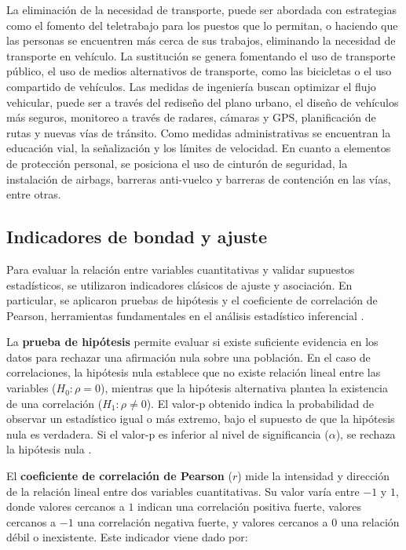 \documentclass[12pt]{article}
\begin{document}
La eliminación de la necesidad de transporte, puede ser abordada con estrategias como el fomento del teletrabajo para los puestos que lo permitan, o haciendo que las personas se encuentren más cerca de sus trabajos, eliminando la necesidad de transporte en vehículo. La sustitución se genera fomentando el uso de transporte público, el uso de medios alternativos de transporte, como las bicicletas o el uso compartido de vehículos. Las medidas de ingeniería buscan optimizar el flujo vehicular, puede ser a través del rediseño del plano urbano, el diseño de vehículos más seguros, monitoreo a través de radares, cámaras y GPS, planificación de rutas y nuevas vías de tránsito. Como medidas administrativas se encuentran la educación vial, la señalización y los límites de velocidad. En cuanto a elementos de protección personal, se posiciona el uso de cinturón de seguridad, la instalación de airbags, barreras anti-vuelco y barreras de contención en las vías, entre otras.

\subsection{Indicadores de bondad y ajuste}

Para evaluar la relación entre variables cuantitativas y validar supuestos estadísticos, se utilizaron indicadores clásicos de ajuste y asociación. En particular, se aplicaron pruebas de hipótesis y el coeficiente de correlación de Pearson, herramientas fundamentales en el análisis estadístico inferencial \citep{devore2011, montgomery2012}.

La \textbf{prueba de hipótesis} permite evaluar si existe suficiente evidencia en los datos para rechazar una afirmación nula sobre una población. En el caso de correlaciones, la hipótesis nula establece que no existe relación lineal entre las variables (\( H_0 : \rho = 0 \)), mientras que la hipótesis alternativa plantea la existencia de una correlación (\( H_1 : \rho \neq 0 \)). El valor-p obtenido indica la probabilidad de observar un estadístico igual o más extremo, bajo el supuesto de que la hipótesis nula es verdadera. Si el valor-p es inferior al nivel de significancia (\( \alpha \)), se rechaza la hipótesis nula \citep{devore2011}.

El \textbf{coeficiente de correlación de Pearson} (\( r \)) mide la intensidad y dirección de la relación lineal entre dos variables cuantitativas. Su valor varía entre $-1$ y $1$, donde valores cercanos a $1$ indican una correlación positiva fuerte, valores cercanos a $-1$ una correlación negativa fuerte, y valores cercanos a $0$ una relación débil o inexistente. Este indicador viene dado por:
\end{document}
